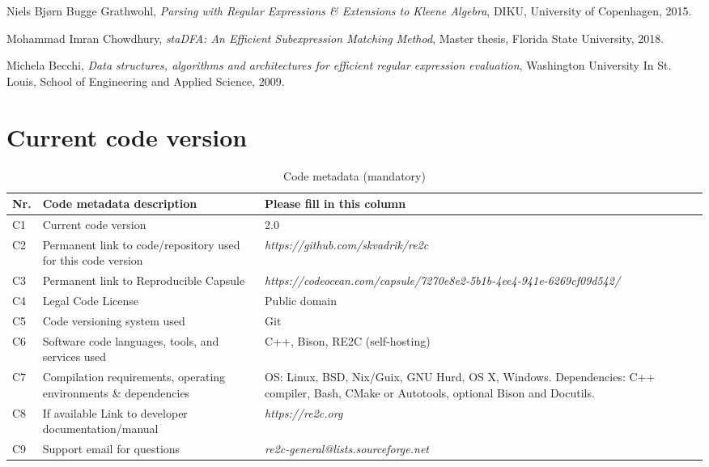 \documentclass[preprint,12pt, a4paper]{elsarticle}
\begin{document}
\begin{thebibliography}{00}
    Niels Bj{\o}rn Bugge Grathwohl,
    \textit{Parsing with Regular Expressions \& Extensions to Kleene Algebra},
    DIKU, University of Copenhagen,
    2015.

    Mohammad Imran Chowdhury,
    \textit{staDFA: An Efficient Subexpression Matching Method},
    Master thesis,
    Florida State University,
    2018.

    Michela Becchi,
    \textit{Data structures, algorithms and architectures for efficient regular expression evaluation},
    Washington University In St. Louis, School of Engineering and Applied Science,
    2009.

\end{thebibliography}

\vfill\null
\clearpage

\section*{Current code version}
\label{}

\begin{table}[!h]
\begin{tabular}{|l|p{5.7cm}|p{7.3cm}|}
\hline
\textbf{Nr.} & \textbf{Code metadata description} & \textbf{Please fill in this column} \\
\hline
C1 & Current code version & 2.0 \\
\hline
C2 & Permanent link to code/repository used for this code version &
    \textit{https://github.com/skvadrik/re2c} \\
\hline
C3  & Permanent link to Reproducible Capsule &
    \textit{https://codeocean.com/capsule/7270e8e2-5b1b-4ee4-941e-6269cf09d542/} \\
\hline
C4 & Legal Code License   & Public domain \\
\hline
C5 & Code versioning system used & Git \\
\hline
C6 & Software code languages, tools, and services used & C++, Bison, RE2C (self-hosting) \\
\hline
C7 & Compilation requirements, operating environments \& dependencies &
    OS: Linux, BSD, Nix/Guix, GNU Hurd, OS X, Windows.
    Dependencies: C++ compiler, Bash, CMake or Autotools, optional Bison and Docutils. \\
\hline
C8 & If available Link to developer documentation/manual & \textit{https://re2c.org} \\
\hline
C9 & Support email for questions & \textit{re2c-general@lists.sourceforge.net} \\
\hline
\end{tabular}
\caption{Code metadata (mandatory)}
\label{} 
\end{table}
\end{document}
